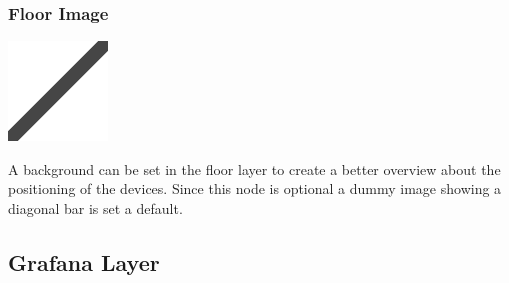 \subsubsection{Floor Image}
\noindent\begin{minipage}{0.15\textwidth}%
\includegraphics[width=\linewidth]{assets/images/dummy2}
\end{minipage}%
\hfill%
\begin{minipage}{0.8\textwidth}
A background can be set in the floor layer to create a better overview about the positioning of the devices. Since this node is optional a dummy image showing a diagonal bar is set a default.
\end{minipage}


\subsection{Grafana Layer}

